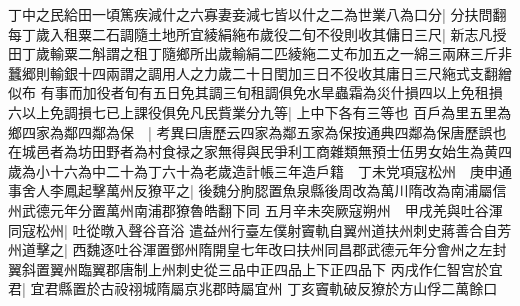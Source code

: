 丁中之民給田一頃篤疾減什之六寡妻妾減七皆以什之二為世業八為口分|{
	分扶問翻}
每丁歲入租粟二石調隨土地所宜綾絹絁布歲役二旬不役則收其傭日三尺|{
	新志凡授田丁歲輸粟二斛謂之租丁隨鄉所出歲輸絹二匹綾絁二丈布加五之一綿三兩麻三斤非蠶郷則輸銀十四兩謂之調用人之力歲二十日閏加三日不役收其庸日三尺絁式支翻繒似布}
有事而加役者旬有五日免其調三旬租調俱免水旱蟲霜為災什損四以上免租損六以上免調損七已上課役俱免凡民貲業分九等|{
	上中下各有三等也}
百戶為里五里為鄉四家為鄰四鄰為保　|{
	考異曰唐歷云四家為鄰五家為保按通典四鄰為保唐歷誤也}
在城邑者為坊田野者為村食禄之家無得與民爭利工商雜類無預士伍男女始生為黄四歲為小十六為中二十為丁六十為老歲造計帳三年造戶籍　丁未党項寇松州　庚申通事舍人李鳳起擊萬州反獠平之|{
	後魏分朐䏰置魚泉縣後周改為萬川隋改為南浦屬信州武德元年分置萬州南浦郡獠魯皓翻下同}
五月辛未突厥寇朔州　甲戌羌與吐谷渾同寇松州|{
	吐從暾入聲谷音浴}
遣益州行臺左僕射竇軌自翼州道扶州刺史蔣善合自芳州道擊之|{
	西魏逐吐谷渾置鄧州隋開皇七年改曰扶州同昌郡武德元年分會州之左封翼斜置翼州臨翼郡唐制上州刺史從三品中正四品上下正四品下}
丙戌作仁智宫於宜君|{
	宜君縣置於古祋祤城隋屬京兆郡時屬宜州}
丁亥竇軌破反獠於方山俘二萬餘口


